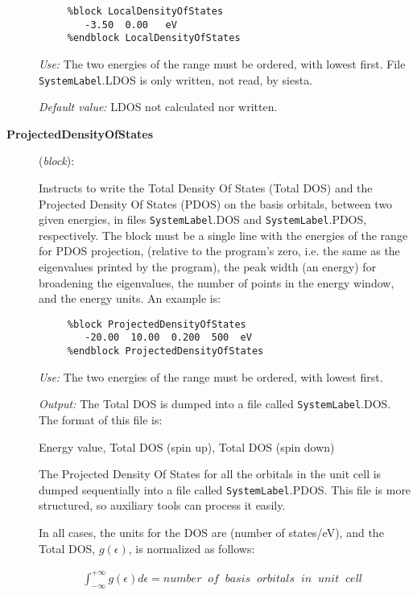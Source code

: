 \documentclass[11pt]{article}
\begin{document}
\begin{description}
\begin{verbatim}
     %block LocalDensityOfStates
        -3.50  0.00   eV
     %endblock LocalDensityOfStates
\end{verbatim}

{\it Use:} The two energies of the range must be ordered,
with lowest first.
File {\tt SystemLabel}.LDOS is only written, not read, by siesta.

{\it Default value:} LDOS not calculated nor written.
        

\item[{\bf ProjectedDensityOfStates}] ({\it block}):

Instructs to write the Total Density Of States (Total DOS) and the 
Projected Density Of States (PDOS) on the basis orbitals,
between two given energies,
in files {\tt SystemLabel}.DOS and 
{\tt SystemLabel}.PDOS, respectively. 
The block must be a single line with the energies of the range for 
PDOS projection,
(relative to the program's zero, i.e. the same as the eigenvalues
printed by the program), the peak width (an energy) for broadening
the eigenvalues, the number of points in the energy window, 
and the energy units.
An example is:

\begin{verbatim}
     %block ProjectedDensityOfStates
        -20.00  10.00  0.200  500  eV
     %endblock ProjectedDensityOfStates
\end{verbatim}

{\it Use:} The two energies of the range must be ordered, with lowest
first. 

{\it Output:} The Total DOS is dumped into a file
called {\tt SystemLabel}.DOS. The format of this file is:

Energy value, Total DOS (spin up), Total DOS (spin down)

The Projected Density Of States for all the orbitals in the unit cell
is dumped sequentially into a file called {\tt SystemLabel}.PDOS. This
file is more structured, so auxiliary tools can process it easily.

In all cases, the units for the DOS are (number of states/eV), and the
Total DOS, $g \left(\epsilon\right)$, is normalized as follows:

\begin{eqnarray}
   \int_{-\infty}^{+\infty} g \left(\epsilon\right) d\epsilon = 
   number \;\; of \;\; basis \;\; orbitals \;\; in \;\;  unit \;\; cell \;\;
   \nonumber \\
\end{eqnarray}



\end{description}
\end{document}
